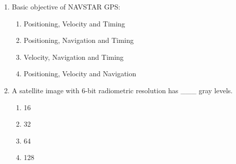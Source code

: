 \documentclass[12pt,a4paper]{article}
\begin{document}
\begin{enumerate}
\item Basic objective of NAVSTAR GPS:
\begin{enumerate}
    \item Positioning, Velocity and Timing
    \item Positioning, Navigation and Timing
    \item Velocity, Navigation and Timing
    \item Positioning, Velocity and Navigation
\end{enumerate}

\item A satellite image with 6-bit radiometric resolution has \_\_\_ gray levels.
\begin{enumerate}
    \item 16
    \item 32
    \item 64
    \item 128
\end{enumerate}

\end{enumerate}
\end{document}
